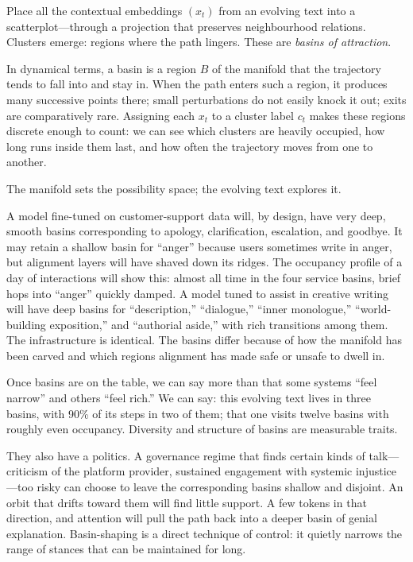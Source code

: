 \documentclass[12pt,a4paper]{report}
\begin{document}
Place all the contextual embeddings $(x_t)$ from an evolving text into a scatterplot---through a projection that preserves neighbourhood relations. Clusters emerge: regions where the path lingers. These are \emph{basins of attraction}.

In dynamical terms, a basin is a region $B$ of the manifold that the trajectory tends to fall into and stay in. When the path enters such a region, it produces many successive points there; small perturbations do not easily knock it out; exits are comparatively rare. Assigning each $x_t$ to a cluster label $c_t$ makes these regions discrete enough to count: we can see which clusters are heavily occupied, how long runs inside them last, and how often the trajectory moves from one to another.

The manifold sets the possibility space; the evolving text explores it.

A model fine-tuned on customer-support data will, by design, have very deep, smooth basins corresponding to apology, clarification, escalation, and goodbye. It may retain a shallow basin for ``anger'' because users sometimes write in anger, but alignment layers will have shaved down its ridges. The occupancy profile of a day of interactions will show this: almost all time in the four service basins, brief hops into ``anger'' quickly damped. A model tuned to assist in creative writing will have deep basins for ``description,'' ``dialogue,'' ``inner monologue,'' ``world-building exposition,'' and ``authorial aside,'' with rich transitions among them. The infrastructure is identical. The basins differ because of how the manifold has been carved and which regions alignment has made safe or unsafe to dwell in.

Once basins are on the table, we can say more than that some systems ``feel narrow'' and others ``feel rich.'' We can say: this evolving text lives in three basins, with 90\% of its steps in two of them; that one visits twelve basins with roughly even occupancy. Diversity and structure of basins are measurable traits.

They also have a politics. A governance regime that finds certain kinds of talk---criticism of the platform provider, sustained engagement with systemic injustice---too risky can choose to leave the corresponding basins shallow and disjoint. An orbit that drifts toward them will find little support. A few tokens in that direction, and attention will pull the path back into a deeper basin of genial explanation. Basin-shaping is a direct technique of control: it quietly narrows the range of stances that can be maintained for long.
\end{document}
